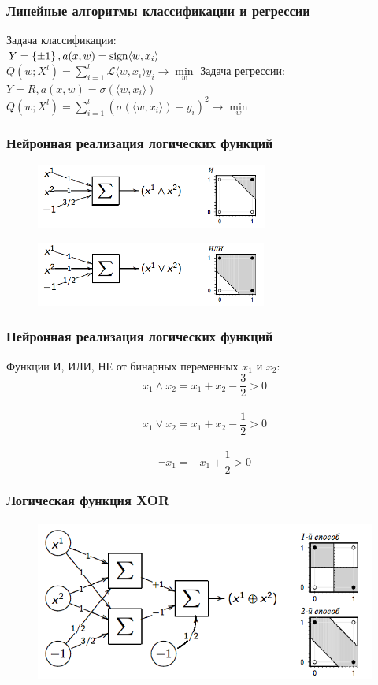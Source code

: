 \documentclass[12pt]{beamer}
\begin{document}
\begin{frame}\frametitle{Линейные алгоритмы классификации и регрессии}
Задача классификации: \\
$Y = \left\{ \pm1 \right\}, a(x,w) = \operatorname{sign} \langle w, x_i \rangle $\\
$Q(w;X^l) = \sum\limits_{i=1}^l \mathcal{L} \langle w, x_i\rangle y_i \rightarrow \min\limits_w$
Задача регрессии:\\
$Y = R, a(x,w) = \sigma(\langle w, x_i \rangle)$\\
$Q(w;X^l) = \sum\limits_{i=1}^l (\sigma(\langle w, x_i \rangle) - y_i)^2 \rightarrow \min\limits_w $
\end{frame}

\begin{frame}\frametitle{Нейронная реализация логических функций}

\begin{figure}[htbp]
  \includegraphics[height=60pt, keepaspectratio = true]{images/OR}   
\end{figure}

\begin{figure}[htbp]
  \includegraphics[height=60pt, keepaspectratio = true]{images/AND}   
\end{figure}

\end{frame}

\begin{frame}\frametitle{Нейронная реализация логических функций}
Функции И, ИЛИ, НЕ от бинарных переменных $x_1$ и $x_2$:\\
$$x_1 \wedge x_2 = x_1 + x_2 - \frac{3}{2} > 0$$\\
$$x_1 \vee x_2 = x_1 + x_2 - \frac{1}{2} > 0$$\\
$$\neg x_1 = -x_1 + \frac{1}{2}> 0$$
\end{frame}


\begin{frame}\frametitle{Логическая функция XOR}

\begin{figure}[htbp]
  \includegraphics[height=150pt, keepaspectratio = true]{images/XOR}   
\end{figure}
\end{frame}
\end{document}
